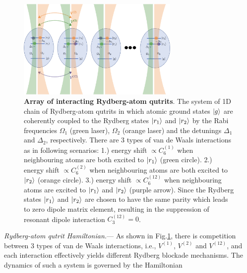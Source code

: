 \documentclass[%
 reprint,
nofootinbib,
 amsmath,amssymb,
 aps,
floatfix,
]{revtex4-2}
\begin{document}
\begin{figure}[ht!]
    \centering
    \includegraphics[width=7.8cm]{picture/many-qutrit.png}
    \caption{\textbf{Array of interacting Rydberg-atom qutrits}. The system of 1D chain of Rydberg-atom qutrits in which atomic ground states $\ket{g}$ are coherently coupled to the Rydberg states $\ket{r_1}$ and $\ket{r_2}$ by the Rabi frequencies $\Omega_1$ (green laser), $\Omega_2$ (orange laser) and the detunings $\Delta_1$ and $\Delta_2$, respectively. There are 3 types of van de Waals interactions as in following scenarios: 1.) energy shift $\propto C^{(1)}_6$ when neighbouring atoms are both excited to $\ket{r_1}$ (green circle). 2.) energy shift $\propto C^{(2)}_6$ when neighbouring atoms are both excited to $\ket{r_2}$ (orange circle). 3.) energy shift $\propto C^{(12)}_6$ when neighbouring atoms are excited to $\ket{r_1}$ and $\ket{r_2}$ (purple arrow). Since the Rydberg states $\ket{r_1}$ and $\ket{r_2}$ are chosen to have the same parity which leads to zero dipole matrix element, resulting in the suppression of resonant dipole interaction $C^{(12)}_3 = 0$. }
    \label{fig:many-qutrit}
\end{figure}

\emph{Rydberg-atom qutrit Hamiltonian.}--- As shown in Fig.\ref{fig:many-qutrit}, there is competition between 3 types of van de Waals interactions, i.e., $V^{(1)}$, $V^{(2)}$ and $V^{(12)}$, and each interaction effectively yields different Rydberg blockade mechanisms. The dynamics of such a system is governed by the Hamiltonian 
\end{document}
